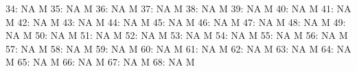 \documentclass[nojss]{jss}
\begin{document}
\begin{Schunk}
\begin{Soutput}
 34:                         NA                                          M
 35:                         NA                                          M
 36:                         NA                                          M
 37:                         NA                                          M
 38:                         NA                                          M
 39:                         NA                                          M
 40:                         NA                                          M
 41:                         NA                                          M
 42:                         NA                                          M
 43:                         NA                                          M
 44:                         NA                                          M
 45:                         NA                                          M
 46:                         NA                                          M
 47:                         NA                                          M
 48:                         NA                                          M
 49:                         NA                                          M
 50:                         NA                                          M
 51:                         NA                                          M
 52:                         NA                                          M
 53:                         NA                                          M
 54:                         NA                                          M
 55:                         NA                                          M
 56:                         NA                                          M
 57:                         NA                                          M
 58:                         NA                                          M
 59:                         NA                                          M
 60:                         NA                                          M
 61:                         NA                                          M
 62:                         NA                                          M
 63:                         NA                                          M
 64:                         NA                                          M
 65:                         NA                                          M
 66:                         NA                                          M
 67:                         NA                                          M
 68:                         NA                                          M

\end{Soutput}
\end{Schunk}
\end{document}
